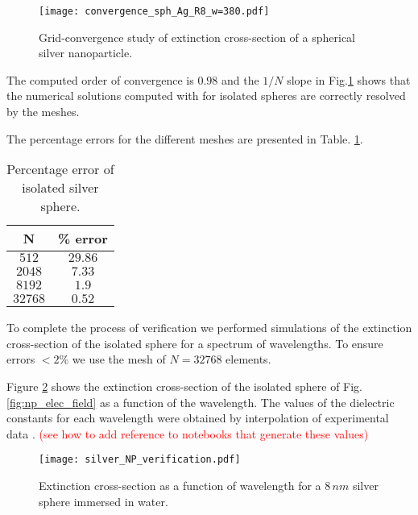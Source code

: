 \begin{figure}[h] %
   \centering
   \texttt{[image: convergence\_sph\_Ag\_R8\_w=380.pdf]} 
   \caption{Grid-convergence study of extinction cross-section of a spherical silver
            nanoparticle.}
   \label{fig:error_sphere_Ag}
\end{figure}

The computed order of convergence is $0.98$ and the $1/N$ slope in Fig.\ref{fig:error_sphere_Ag}
shows that the numerical solutions computed with \pygbe for isolated spheres are
correctly resolved by the meshes.

The percentage errors for the different meshes are presented in Table. \ref{table:err_iso_sphere}.

\begin{table}[h]
    \centering
    \caption{\label{table:err_iso_sphere} Percentage error of isolated silver sphere.} 
    \begin{tabular}{c c}
    \hline%
    N & \% error \\
    \hline%
     $512$ & $29.86$ \\
     $2048$ & $7.33$ \\
     $8192$ & $1.9$ \\
     $32768$ & $0.52$ \\
    \hline%
    \end{tabular}
\end{table}


To complete the process of verification we performed simulations of the extinction 
cross-section of the isolated sphere for a spectrum of wavelengths. To ensure 
errors $<2\%$ we use the mesh of $N=32768$ elements. 

Figure \ref{fig:verif_sphere} shows the extinction cross-section of the isolated
sphere of Fig.\ref{fig:np_elec_field} as a function of the wavelength. The values of 
the dielectric constants for each wavelength were obtained by interpolation of 
experimental data \cite{JohnsonChristy1972, HaleQuerry1972}. \textcolor{red}{(see how to add
reference to notebooks that generate these values)}


\begin{figure}[h] %
   \centering
   \texttt{[image: silver\_NP\_verification.pdf]} 
   \caption{Extinction cross-section as a function of wavelength for a $8 \, nm$
            silver sphere immersed in water.}
   \label{fig:verif_sphere}
\end{figure}

